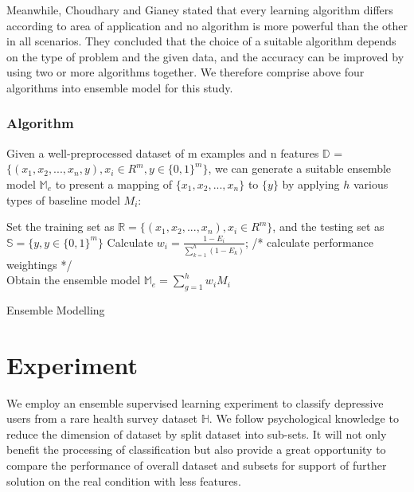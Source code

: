 \documentclass[12pt]{article}
\begin{document}
Meanwhile, Choudhary and Gianey \cite{Choudhary} stated that every learning algorithm differs according to area of application and no algorithm is more powerful than the other in all scenarios. They concluded that the choice of a suitable algorithm depends on the type of problem and the given data, and the accuracy can be improved by using two or more algorithms together. We therefore comprise above four algorithms into ensemble model for this study.

\subsubsection{Algorithm}
Given a well-preprocessed dataset of m examples and n features $\mathbb{D}$ = $\displaystyle \big\{ (x_{1}, x_{2}, ... , x_{n}, y ), x_{i} \in R^{m}, y \in {\{0, 1\}}^{m}  \big\}$, we can generate a suitable ensemble model $\mathbb{M}_{e} $ to present a mapping of $\big\{ x_{1}, x_{2}, ... , x_{n} \big\}$ to $\big\{ y \big\}$ by applying $h$ various types of baseline model $M_{i}$:\\
\IncMargin{2em}
\begin{algorithm}[H]
\BlankLine
Set the training set as $\mathbb{R} = \big\{ (x_{1}, x_{2}, ... , x_{n} ), x_{i} \in R^{m} \big\}$, and the testing set as $\mathbb{S} = \big\{  y, y \in {\{0, 1\}}^{m}  \big\}$\;
Calculate $w_{i} = \frac{1 - E_{i} }{\sum_{k = 1}^{h} (1 - E_{k}) }$; /* calculate performance weightings */\\
Obtain the ensemble model $\mathbb{M}_{e} = \sum_{g = 1}^{h} w_{i} M_{i} $\;
\caption{Ensemble Modelling}\label{ensemble}
\end{algorithm}\DecMargin{2em}


\bigskip
\goodbreak
\section{Experiment}
We employ an ensemble supervised learning experiment to classify depressive users from a rare health survey dataset $\mathbb{H}$. We follow psychological knowledge to reduce the dimension of dataset by split dataset into sub-sets. It will not only benefit the processing of classification but also provide a great opportunity to compare the performance of overall dataset and subsets for support of further solution on the real condition with less features.
\end{document}
